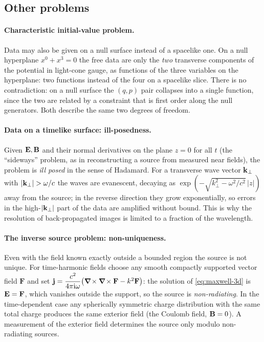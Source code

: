 \subsection{Other problems}

\paragraph{Characteristic initial-value problem.}  Data may also be given on a null
surface instead of a spacelike one.  On a null hyperplane $x^0+x^3=0$ the
free data are only the \emph{two} transverse components of the potential in
light-cone gauge, as functions of the three variables on the hyperplane:
two functions instead of the four on a spacelike slice.  There is no
contradiction: on a null surface the $(q,p)$ pair collapses into a
single function, since the two are related by a constraint
that is first order along the null generators.  Both
describe the same two degrees of freedom.

\paragraph{Data on a timelike surface: ill-posedness.}  Given $\mathbf{E},\mathbf{B}$ and
their normal derivatives on the plane $z=0$ for all $t$ (the ``sideways'' problem, as in
reconstructing a source from measured near fields), the problem is
\emph{ill posed} in the sense of Hadamard.  For a transverse wave
vector $\mathbf{k}_\perp$ with $|\vk_\perp|>\omega/c$ the waves are
evanescent, decaying as $\exp(-\sqrt{k_\perp^2-\omega^2/c^2}\,|z|)$
away from the source; in the reverse direction they grow
exponentially, so errors in the high-$|\mathbf{k}_\perp|$ part of the data are
amplified without bound.  This is why the resolution of back-propagated
images is limited to a fraction of the wavelength.

\paragraph{The inverse source problem: non-uniqueness.}  Even with the field
known exactly outside a bounded region the source is not unique.  For
time-harmonic fields choose any smooth compactly supported vector field
$\mathbf F$ and set
$\mathbf{j}=\dfrac{c^2}{4\pi\mathrm{i}\omega}\big(\boldsymbol{\nabla}\!\times\boldsymbol{\nabla}\!\times\mathbf F-k^2\mathbf F\big)$:
the solution of \eqref{eq:maxwell-3d} is $\mathbf{E}=\mathbf F$, which vanishes outside the
support, so the source is \emph{non-radiating}.  In the time-dependent
case any spherically symmetric charge distribution with the same
total charge produces the same exterior field (the Coulomb field,
$\mathbf{B}=0$).  A measurement of the exterior field determines the
source only modulo non-radiating sources.

